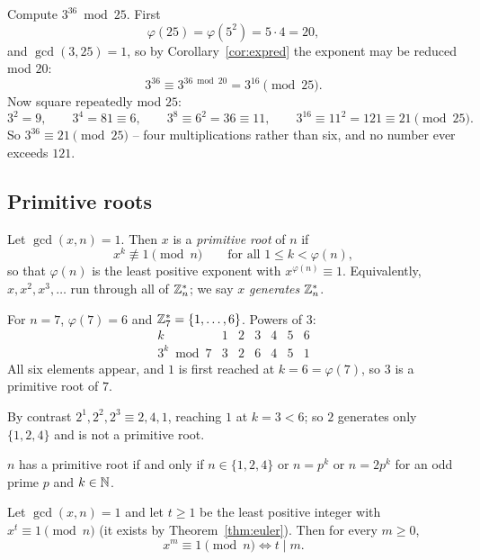 \documentclass[11pt]{article}
\begin{document}
\begin{example}
Compute $3^{36}\bmod25$. First
\[
\varphi(25)=\varphi(5^2)=5\cdot4=20,
\]
and $\gcd(3,25)=1$, so by Corollary~\ref{cor:expred} the exponent may be reduced mod $20$:
\[
3^{36}\equiv3^{36\bmod20}=3^{16}\pmod{25}.
\]
Now square repeatedly mod $25$:
\[
3^2=9, \qquad 3^4=81\equiv6, \qquad 3^8\equiv6^2=36\equiv11, \qquad 3^{16}\equiv11^2=121\equiv21 \pmod{25}.
\]
So $3^{36}\equiv21\pmod{25}$ -- four multiplications rather than six, and no number ever exceeds $121$.
\end{example}

\subsection{Primitive roots}
\label{sec:primroot}

\begin{definition}
Let $\gcd(x,n)=1$. Then $x$ is a \emph{primitive root} of $n$ if
\[
x^k\not\equiv1\pmod n \qquad\text{for all } 1\le k<\varphi(n),
\]
so that $\varphi(n)$ is the least positive exponent with $x^{\varphi(n)}\equiv1$. Equivalently, $x,x^2,x^3,\dots$ run through all of $\mathbb{Z}_n^*$; we say $x$ \emph{generates} $\mathbb{Z}_n^*$.
\end{definition}

\begin{example}
For $n=7$, $\varphi(7)=6$ and $\mathbb{Z}_7^*=\{1,\dots,6\}$. Powers of $3$:
\[
\begin{array}{c|cccccc}
k & 1&2&3&4&5&6\\\hline
3^k\bmod7 & 3&2&6&4&5&1
\end{array}
\]
All six elements appear, and $1$ is first reached at $k=6=\varphi(7)$, so $3$ is a primitive root of $7$.

\smallskip
By contrast $2^1,2^2,2^3\equiv2,4,1$, reaching $1$ at $k=3<6$; so $2$ generates only $\{1,2,4\}$ and is not a primitive root.
\end{example}

\begin{theorem}
\label{thm:primrootexists}
$n$ has a primitive root if and only if $n\in\{1,2,4\}$ or $n=p^k$ or $n=2p^k$ for an odd prime $p$ and $k\in\mathbb{N}$.
\end{theorem}

\begin{lemma}
\label{lem:order}
Let $\gcd(x,n)=1$ and let $t\ge1$ be the least positive integer with $x^t\equiv1\pmod n$ (it exists by Theorem~\ref{thm:euler}). Then for every $m\ge0$,
\[
x^m\equiv1\pmod n \iff t\mid m.
\]
\end{lemma}
\end{document}
